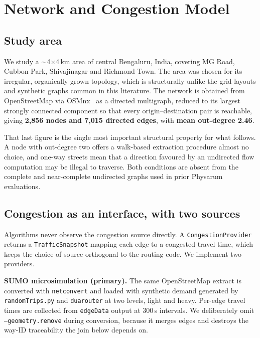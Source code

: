 \section{Network and Congestion Model}
\label{sec:network}

\subsection{Study area}

We study a $\sim$4$\times$4\,km area of central Bengaluru, India, covering
MG Road, Cubbon Park, Shivajinagar and Richmond Town. The area was chosen
for its irregular, organically grown topology, which is structurally unlike
the grid layouts and synthetic graphs common in this literature. The network
is obtained from OpenStreetMap via OSMnx~\cite{boeing2017osmnx} as a directed
multigraph, reduced to its largest strongly connected component so that every
origin--destination pair is reachable, giving \textbf{2{,}856 nodes and
7{,}015 directed edges}, with \textbf{mean out-degree 2.46}.

That last figure is the single most important structural property for what
follows. A node with out-degree two offers a walk-based extraction procedure
almost no choice, and one-way streets mean that a direction favoured by an
undirected flow computation may be illegal to traverse. Both conditions are
absent from the complete and near-complete undirected graphs used in prior
Physarum evaluations.

\subsection{Congestion as an interface, with two sources}

Algorithms never observe the congestion source directly. A
\texttt{Congestion\-Provider} returns a \texttt{TrafficSnapshot} mapping each
edge to a congested travel time, which keeps the choice of source orthogonal
to the routing code. We implement two providers.

\textbf{SUMO microsimulation (primary).} The same OpenStreetMap extract is
converted with \texttt{netconvert} and loaded with synthetic demand generated
by \texttt{randomTrips.py} and \texttt{duarouter} at two levels, light and
heavy. Per-edge travel times are collected from \texttt{edgeData} output at
300\,s intervals. We deliberately omit \texttt{--geometry.remove} during
conversion, because it merges edges and destroys the way-ID traceability the
join below depends on.

